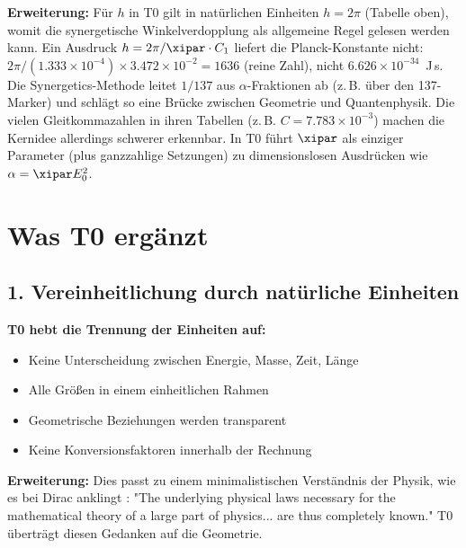 	\begin{center}
	\end{center}
	
	\textbf{Erweiterung:} Für $h$ in T0 gilt in natürlichen Einheiten $h = 2\pi$ (Tabelle oben), womit die synergetische Winkelverdopplung als allgemeine Regel gelesen werden kann. Ein Ausdruck $h = 2\pi / \xipar \cdot C_1$ liefert die Planck-Konstante nicht: $2\pi/(1.333\times10^{-4})\times3.472\times10^{-2} = 1636$ (reine Zahl), nicht $6.626\times10^{-34}$~J\,s. Die Synergetics-Methode leitet $1/137$ aus $\alpha$-Fraktionen ab (z.\,B. über den 137-Marker) und schlägt so eine Brücke zwischen Geometrie und Quantenphysik. Die vielen Gleitkommazahlen in ihren Tabellen (z.\,B. $C = 7.783 \times 10^{-3}$) machen die Kernidee allerdings schwerer erkennbar. In T0 führt $\xipar$ als einziger Parameter (plus ganzzahlige Setzungen) zu dimensionslosen Ausdrücken wie $\alpha = \xipar E_0^2$.
	
	\section{Was T0 ergänzt}
	
	\subsection{1. Vereinheitlichung durch natürliche Einheiten}
	
	\begin{vorteil}
		\textbf{T0 hebt die Trennung der Einheiten auf:}
		\begin{itemize}
			\item Keine Unterscheidung zwischen Energie, Masse, Zeit, Länge
			\item Alle Größen in einem einheitlichen Rahmen
			\item Geometrische Beziehungen werden transparent
			\item Keine Konversionsfaktoren innerhalb der Rechnung
		\end{itemize}
		
		\textbf{Erweiterung:} Dies passt zu einem minimalistischen Verständnis der Physik, wie es bei Dirac anklingt \cite{dirac_principles}: "The underlying physical laws necessary for the mathematical theory of a large part of physics... are thus completely known." T0 überträgt diesen Gedanken auf die Geometrie.
	\end{vorteil}
	

